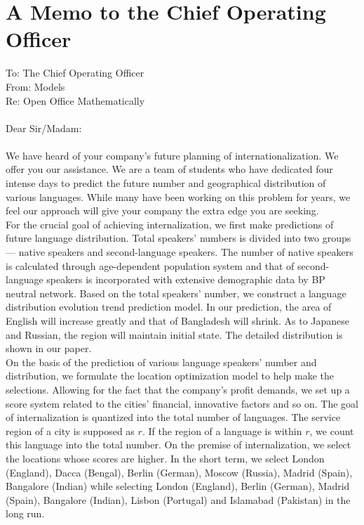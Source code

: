 \documentclass{mcmthesis}
\begin{document}
\section{A Memo to the Chief Operating Officer}
To: The Chief Operating Officer\\
From: Models\\
Re: Open Office Mathematically\\\\
Dear Sir/Madam:\\\\
\indent We have heard of your company's future planning of internationalization. We offer you our assistance. We are a team of students who have dedicated four intense days to predict the future number and geographical distribution of various languages. While many have been working on this problem for years, we feel our approach will give your company the extra edge you are seeking.\\
\indent For the crucial goal of achieving internalization, we first make predictions of future language distribution. Total speakers' numbers is divided into two groups--- native speakers and second-language speakers. The number of native speakers is calculated through age-dependent population system and that of second-language speakers is incorporated with extensive demographic data by BP neutral network. Based on the total speakers' number, we construct a language distribution evolution trend prediction model. In our prediction, the area of English will increase greatly and that of Bangladesh will shrink. As to Japanese and Russian, the region will maintain initial state. The detailed distribution is shown in our paper.\\
\indent On the basis of the prediction of various language speakers' number and distribution, we formulate the location optimization model to help make the selections. Allowing for the fact that the company's profit demands, we set up a score system related to the cities' financial, innovative factors and so on. 
The goal of internalization is quantized into the total number of languages. The service region of a city is supposed as \(r\). If the region of a language is within \(r\), we count this language into the total number. On the premise of internalization, we select the locations whose scores are higher. In the short term, we select London (England), Dacca (Bengal), Berlin (German), Moscow (Russia), Madrid (Spain), Bangalore (Indian) while selecting London (England), Berlin (German), Madrid (Spain), Bangalore (Indian), Lisbon (Portugal) and Islamabad (Pakistan) in the long run.\\
\end{document}
